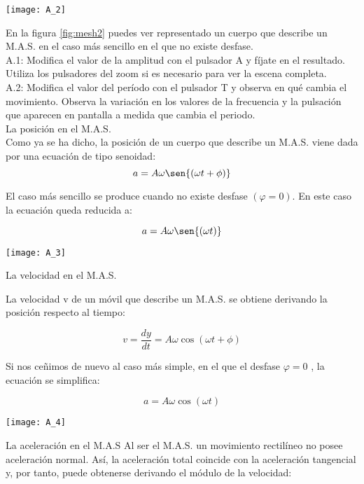 \documentclass[11pt,a4paper]{article}
\newenvironment{Figuras}
  {\par\medskip\noindent\minipage{\linewidth}}
  {\endminipage\par\medskip}
\begin{document}
\begin{multicols}{2}
\begin{Figuras}
	\centering
    \texttt{[image: A\_2]}
    \label{fig:mesh2}
\end{Figuras}

En la figura \ref{fig:mesh2} puedes ver representado un cuerpo que describe un M.A.S. en el caso más sencillo en el que no existe desfase.\\A.1: Modifica el valor de la amplitud con el pulsador A y fíjate en el resultado. Utiliza los pulsadores del zoom si es necesario para ver la escena completa.\\A.2: Modifica el valor del período con el pulsador T y observa en qué cambia el movimiento. Observa la variación en los valores de la frecuencia y la pulsación que aparecen en pantalla a medida que cambia el periodo.\\La posición en el M.A.S.\\Como ya se ha dicho, la posición de un cuerpo que describe un M.A.S. viene dada por una ecuación de tipo senoidad:\\

$$a=A \omega \sen{(\omega t + \phi )}$$

El caso más sencillo se produce cuando no existe desfase $(\varphi=0)$. En este caso la ecuación queda reducida a: 

$$a=A \omega \sen{(\omega t )}$$

\begin{Figuras}
	\centering
    \texttt{[image: A\_3]}
    \label{fig:mesh3}
\end{Figuras}

La velocidad en el M.A.S. 

La velocidad v de un móvil que describe un M.A.S. se obtiene derivando la posición respecto al tiempo:

$$v=\frac{dy}{dt}=A \omega \cos{(\omega t + \phi )}$$

 Si nos ceñimos de nuevo al caso más simple, en el que el desfase $\varphi= 0$ , la ecuación se simplifica:

$$a=A \omega \cos{(\omega t)}$$

\begin{Figuras}
	\centering
    \texttt{[image: A\_4]}
    \label{fig:mesh4}
\end{Figuras}




La aceleración en el M.A.S 
Al ser el M.A.S. un movimiento rectilíneo no posee aceleración normal. Así, la aceleración total coincide con la aceleración tangencial y, por tanto, puede obtenerse derivando el módulo de la velocidad: \\


\end{multicols}
\end{document}
